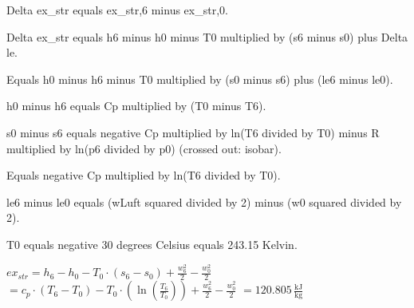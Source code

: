 Delta ex_str equals ex_str,6 minus ex_str,0.

Delta ex_str equals h6 minus h0 minus T0 multiplied by (s6 minus s0) plus Delta le.

Equals h0 minus h6 minus T0 multiplied by (s0 minus s6) plus (le6 minus le0).

h0 minus h6 equals Cp multiplied by (T0 minus T6).

s0 minus s6 equals negative Cp multiplied by ln(T6 divided by T0) minus R multiplied by ln(p6 divided by p0) (crossed out: isobar).

Equals negative Cp multiplied by ln(T6 divided by T0).

le6 minus le0 equals (wLuft squared divided by 2) minus (w0 squared divided by 2).

T0 equals negative 30 degrees Celsius equals 243.15 Kelvin.

\( ex_{str} = h_6 - h_0 - T_0 \cdot (s_6 - s_0) + \frac{w_6^2}{2} - \frac{w_0^2}{2} \)  
\( = c_p \cdot (T_6 - T_0) - T_0 \cdot (\ln \left( \frac{T_6}{T_0} \right)) + \frac{w_6^2}{2} - \frac{w_0^2}{2} \)  
\( = 120.805 \, \frac{\text{kJ}}{\text{kg}} \)